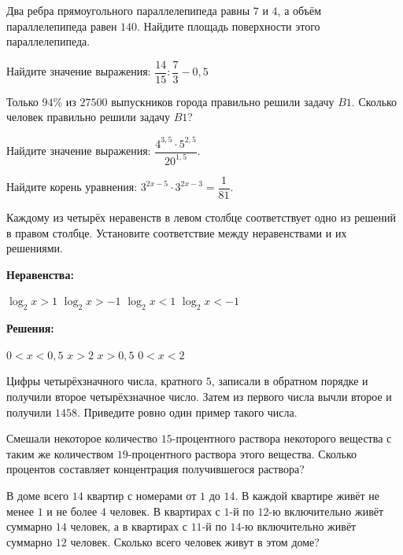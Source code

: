 \begin{homework}[number=3]
\begin{listofex}
		\item Два ребра прямоугольного параллелепипеда равны \(7\) и \(4\), а объём параллелепипеда равен \(140\). Найдите площадь поверхности этого параллелепипеда.
		\item Найдите значение выражения: \(\dfrac{ 14 }{15  }:\dfrac{ 7 }{ 3 }-0,5\)
		\item Только \(94\%\) из \(27 500\) выпускников города правильно решили задачу \(B1\). Сколько человек правильно решили задачу \(B1\)?
		\item Найдите значение выражения: \(\dfrac{ 4^{3,5}\cdot 5^{2,5} }{ 20^{1,5} }\).
		\item Найдите корень уравнения: \(3^{2x-5}\cdot 3^{2x-3}=\dfrac{ 1 }{ 81 }\).
		\item Каждому из четырёх неравенств в левом столбце соответствует одно из решений в правом столбце. Установите соответствие между неравенствами и их решениями. \\
		\begin{minipage}[t]{0.55\linewidth}
			\textbf{Неравенства:}
			\begin{tasks}
				\task \( \log_2 x >1 \)
				\task \( \log_2 x >-1 \)
				\task \( \log_2 x <1 \)
				\task \(\log_2 x <-1 \)
			\end{tasks}
		\end{minipage}
		\hspace{0.02\linewidth}
		\begin{minipage}[t]{0.4\linewidth}
			\textbf{Решения:}
			\begin{tasks}
				\task \( 0<x<0,5 \)
				\task \( x>2 \)
				\task \( x>0,5 \)
				\task \( 0<x<2 \)
			\end{tasks}
		\end{minipage}
		\item Цифры четырёхзначного числа, кратного \(5\), записали в обратном порядке и получили второе четырёхзначное число. Затем из первого числа вычли второе и получили \(1458\). Приведите ровно один пример такого числа.
		\item Смешали некоторое количество \(15\)-процентного раствора некоторого вещества с таким же количеством \(19\)-процентного раствора этого вещества. Сколько процентов составляет концентрация получившегося раствора?
		\item В доме всего \(14\) квартир с номерами от \(1\) до \(14\). В каждой квартире живёт не менее \(1\) и не более \(4\) человек. В квартирах с \(1\)-й по \(12\)-ю включительно живёт суммарно \(14\) человек, а в квартирах с \(11\)-й по \(14\)-ю включительно живёт суммарно \(12\) человек. Сколько всего человек живут в этом доме?
	\end{listofex}
\end{homework}

